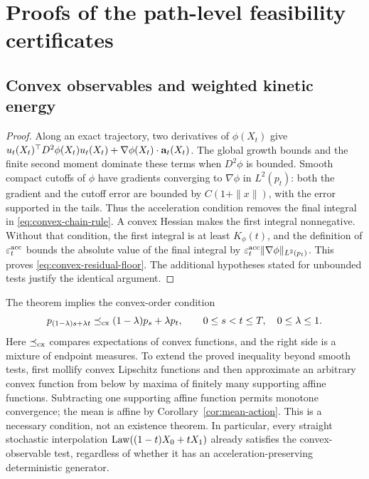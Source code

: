 \section{Proofs of the path-level feasibility certificates}
\label{app:convex-feasibility}

\subsection{Convex observables and weighted kinetic energy}
\begin{proof}
Along an exact trajectory, two derivatives of $\phi(X_t)$ give
$u_t(X_t)^\top D^2\phi(X_t)u_t(X_t)+
\nabla\phi(X_t)\cdot\mathbf a_t(X_t)$.
The global growth bounds and the finite second moment dominate these terms
when $D^2\phi$ is bounded.  Smooth compact cutoffs of $\phi$ have gradients
converging to $\nabla\phi$ in $L^2(p_t)$: both the gradient and the cutoff
error are bounded by $C(1+\|x\|)$, with the error supported in the tails.
Thus the acceleration condition removes the final integral in
\eqref{eq:convex-chain-rule}.  A convex Hessian makes the first integral
nonnegative.  Without that condition, the first integral is at least
$K_\phi(t)$, and the definition of $\varepsilon_t^{\rm acc}$ bounds the
absolute value of the final integral by
$\varepsilon_t^{\rm acc}\|\nabla\phi\|_{L^2(p_t)}$.  This proves
\eqref{eq:convex-residual-floor}.  The additional hypotheses stated for
unbounded tests justify the identical argument.
\end{proof}

The theorem implies the convex-order condition
\begin{equation}
 p_{(1-\lambda)s+\lambda t}
 \preceq_{\rm cx}(1-\lambda)p_s+\lambda p_t,
 \qquad 0\le s<t\le T,\quad 0\le\lambda\le1.
 \label{eq:convex-order-path}
\end{equation}
Here $\preceq_{\rm cx}$ compares expectations of convex functions, and the
right side is a mixture of endpoint measures.  To extend the proved
inequality beyond smooth tests, first mollify convex Lipschitz functions
and then approximate an arbitrary convex function from below by maxima of
finitely many supporting affine functions.  Subtracting one supporting
affine function permits monotone convergence; the mean is affine by
Corollary~\ref{cor:mean-action}.  This is a necessary condition, not an
existence theorem.  In particular, every straight stochastic interpolation
$\operatorname{Law}((1-t)X_0+tX_1)$ already satisfies the convex-observable test, regardless
of whether it has an acceleration-preserving deterministic generator.


